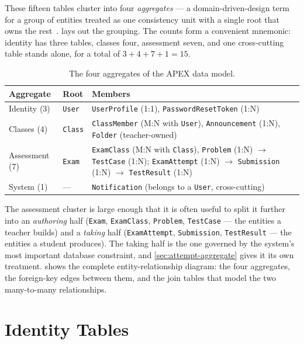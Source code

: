 These fifteen tables cluster into four \emph{aggregates} --- a
domain-driven-design term for a group of entities treated as one consistency
unit with a single root that owns the rest~\cite{fowler2002patterns,
kleppmann2017ddia}.  lays out the grouping. The counts
form a convenient mnemonic: identity has three tables, classes four,
assessment seven, and one cross-cutting table stands alone, for a total of
$3+4+7+1=15$.

\begin{table}[htbp]
\centering
\caption{The four aggregates of the APEX data model.}
\label{tab:aggregates}
\begin{tabularx}{\linewidth}{@{}L{2.6cm} L{3.0cm} X@{}}
\toprule
\textbf{Aggregate} & \textbf{Root} & \textbf{Members} \\
\midrule
Identity (3)   & \texttt{User}        & \texttt{UserProfile} (1:1), \texttt{PasswordResetToken} (1:N) \\
Classes (4)    & \texttt{Class}       & \texttt{ClassMember} (M:N with \texttt{User}), \texttt{Announcement} (1:N), \texttt{Folder} (teacher-owned) \\
Assessment (7) & \texttt{Exam}        & \texttt{ExamClass} (M:N with \texttt{Class}), \texttt{Problem} (1:N) $\rightarrow$ \texttt{TestCase} (1:N); \texttt{ExamAttempt} (1:N) $\rightarrow$ \texttt{Submission} (1:N) $\rightarrow$ \texttt{TestResult} (1:N) \\
System (1)     & ---                  & \texttt{Notification} (belongs to a \texttt{User}, cross-cutting) \\
\bottomrule
\end{tabularx}
\end{table}

The assessment cluster is large enough that it is often useful to split it
further into an \emph{authoring} half (\texttt{Exam}, \texttt{ExamClass},
\texttt{Problem}, \texttt{TestCase} --- the entities a teacher builds) and a
\emph{taking} half (\texttt{ExamAttempt}, \texttt{Submission},
\texttt{TestResult} --- the entities a student produces). The taking half is
the one governed by the system's most important database constraint, and
\cref{sec:attempt-aggregate} gives it its own treatment.
 shows the complete entity-relationship diagram: the four
aggregates, the foreign-key edges between them, and the join tables that
model the two many-to-many relationships.



\section{Identity Tables}

